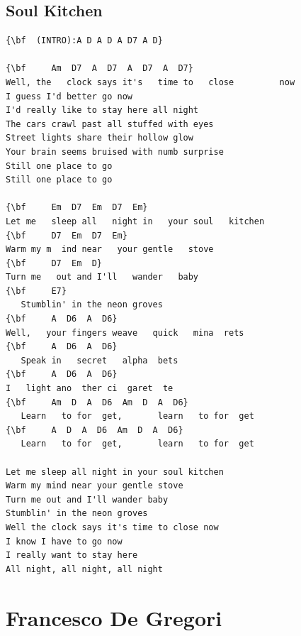 \documentclass[a4paper]{article}
\begin{document}
\subsection{Soul Kitchen}
\begin{Verbatim}[commandchars=\\\{\}]
{\bf  (INTRO):A D A D A D7 A D}

{\bf     Am  D7  A  D7  A  D7  A  D7}
Well, the   clock says it's   time to   close         now         
I guess I'd better go now
I'd really like to stay here all night
The cars crawl past all stuffed with eyes
Street lights share their hollow glow
Your brain seems bruised with numb surprise
Still one place to go
Still one place to go

{\bf     Em  D7  Em  D7  Em}
Let me   sleep all   night in   your soul   kitchen   
{\bf     D7  Em  D7  Em}
Warm my m  ind near   your gentle   stove   
{\bf     D7  Em  D}
Turn me   out and I'll   wander   baby
{\bf     E7}
   Stumblin' in the neon groves
{\bf     A  D6  A  D6}
Well,   your fingers weave   quick   mina  rets
{\bf     A  D6  A  D6}
   Speak in   secret   alpha  bets
{\bf     A  D6  A  D6}
I   light ano  ther ci  garet  te
{\bf     Am  D  A  D6  Am  D  A  D6}
   Learn   to for  get,       learn   to for  get   
{\bf     A  D  A  D6  Am  D  A  D6}
   Learn   to for  get,       learn   to for  get   

Let me sleep all night in your soul kitchen
Warm my mind near your gentle stove
Turn me out and I'll wander baby
Stumblin' in the neon groves
Well the clock says it's time to close now
I know I have to go now
I really want to stay here
All night, all night, all night

\end{Verbatim}
\newpage
\section{Francesco De Gregori}
\end{document}
